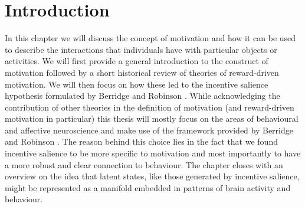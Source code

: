 \section{Introduction}
\label{motivation_engagement_introduction}
In this chapter we will discuss the concept of motivation and how it can be used to describe the interactions that individuals have with particular objects or activities. We will first provide a general introduction to the construct of motivation followed by a short historical review of theories of reward-driven motivation. We will then focus on how these led to the incentive salience hypothesis formulated by Berridge and Robinson \cite{berridge1998role}. While acknowledging the contribution of other theories in the definition of motivation (and reward-driven motivation in particular) this thesis will mostly focus on the areas of behavioural and affective neuroscience and make use of the framework provided by Berridge and Robinson \cite{berridge1998role}. The reason behind this choice lies in the fact that we found incentive salience to be more specific to motivation and most importantly to have a more robust and clear connection to behaviour. \lorem
The chapter closes with an overview on the idea that latent states, like those generated by incentive salience, might be represented as a manifold embedded in patterns of brain activity and behaviour.

